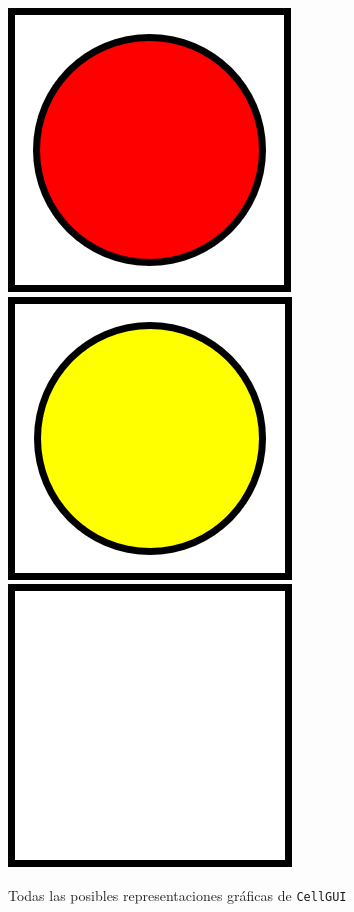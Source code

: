 \documentclass[12pt,a4paper,openright]{book}
\theoremstyle{break}
\begin{document}
\begin{center}
\includegraphics[scale=0.65]{redCube.png}
\includegraphics[scale=0.65]{yellowCube.png}
\includegraphics[scale=0.65]{emptyCell.png}

Todas las posibles representaciones gráficas de \texttt{CellGUI}
\end{center}

\newpage
\end{document}

